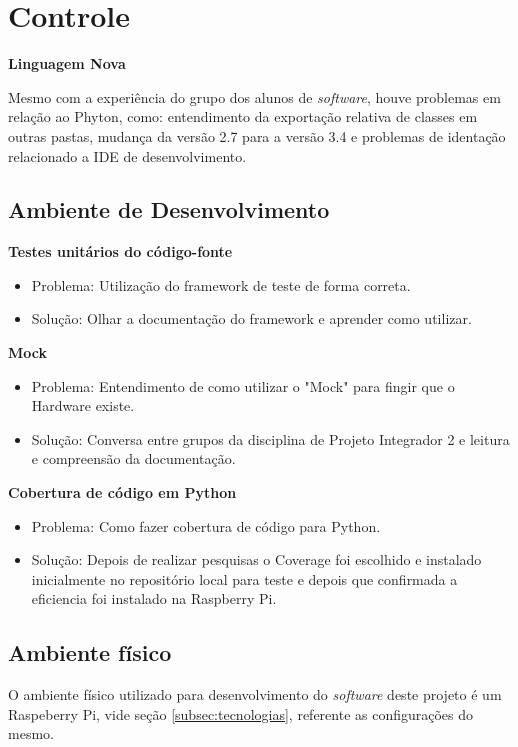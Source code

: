 \section{Controle}

  \textbf{Linguagem Nova}

    Mesmo com a experiência do grupo dos alunos de \textit{software}, houve problemas em relação ao Phyton, como: entendimento da exportação relativa de classes em outras pastas, mudança da versão 2.7 para a versão 3.4 e problemas de identação relacionado a IDE de desenvolvimento.

\subsection{Ambiente de Desenvolvimento}

\textbf{Testes unitários do código-fonte}

    \begin{itemize}
      \item Problema: Utilização do framework de teste de forma correta.
	  \item Solução: Olhar a documentação do framework e aprender como utilizar.

    \end{itemize}

\textbf{Mock}

 \begin{itemize}
      \item Problema: Entendimento de como utilizar o "Mock" para fingir que o Hardware existe.
	  \item Solução: Conversa entre grupos da disciplina de Projeto Integrador 2 e leitura e compreensão da documentação.

    \end{itemize}

\textbf{Cobertura de código em Python}

 \begin{itemize}
      \item Problema: Como fazer cobertura de código para Python.
	  \item Solução: Depois de realizar pesquisas o Coverage foi escolhido e instalado inicialmente no repositório local para teste e depois que confirmada a eficiencia foi instalado na Raspberry Pi.
    \end{itemize}

\subsection{Ambiente físico}
O ambiente físico utilizado para desenvolvimento do \textit{software} deste projeto é um Raspeberry Pi, vide seção \ref{subsec:tecnologias}, referente as configurações do mesmo.

